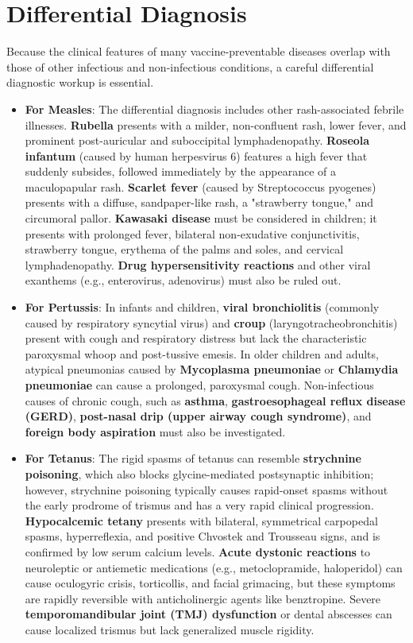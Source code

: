 \section*{Differential Diagnosis}
Because the clinical features of many vaccine-preventable diseases overlap with those of other infectious and non-infectious conditions, a careful differential diagnostic workup is essential.
\begin{itemize}
    \item \textbf{For Measles}: The differential diagnosis includes other rash-associated febrile illnesses. \textbf{Rubella} presents with a milder, non-confluent rash, lower fever, and prominent post-auricular and suboccipital lymphadenopathy. \textbf{Roseola infantum} (caused by human herpesvirus 6) features a high fever that suddenly subsides, followed immediately by the appearance of a maculopapular rash. \textbf{Scarlet fever} (caused by Streptococcus pyogenes) presents with a diffuse, sandpaper-like rash, a "strawberry tongue," and circumoral pallor. \textbf{Kawasaki disease} must be considered in children; it presents with prolonged fever, bilateral non-exudative conjunctivitis, strawberry tongue, erythema of the palms and soles, and cervical lymphadenopathy. \textbf{Drug hypersensitivity reactions} and other viral exanthems (e.g., enterovirus, adenovirus) must also be ruled out.
    \item \textbf{For Pertussis}: In infants and children, \textbf{viral bronchiolitis} (commonly caused by respiratory syncytial virus) and \textbf{croup} (laryngotracheobronchitis) present with cough and respiratory distress but lack the characteristic paroxysmal whoop and post-tussive emesis. In older children and adults, atypical pneumonias caused by \textbf{Mycoplasma pneumoniae} or \textbf{Chlamydia pneumoniae} can cause a prolonged, paroxysmal cough. Non-infectious causes of chronic cough, such as \textbf{asthma}, \textbf{gastroesophageal reflux disease (GERD)}, \textbf{post-nasal drip (upper airway cough syndrome)}, and \textbf{foreign body aspiration} must also be investigated.
    \item \textbf{For Tetanus}: The rigid spasms of tetanus can resemble \textbf{strychnine poisoning}, which also blocks glycine-mediated postsynaptic inhibition; however, strychnine poisoning typically causes rapid-onset spasms without the early prodrome of trismus and has a very rapid clinical progression. \textbf{Hypocalcemic tetany} presents with bilateral, symmetrical carpopedal spasms, hyperreflexia, and positive Chvostek and Trousseau signs, and is confirmed by low serum calcium levels. \textbf{Acute dystonic reactions} to neuroleptic or antiemetic medications (e.g., metoclopramide, haloperidol) can cause oculogyric crisis, torticollis, and facial grimacing, but these symptoms are rapidly reversible with anticholinergic agents like benztropine. Severe \textbf{temporomandibular joint (TMJ) dysfunction} or dental abscesses can cause localized trismus but lack generalized muscle rigidity.

\end{itemize}
